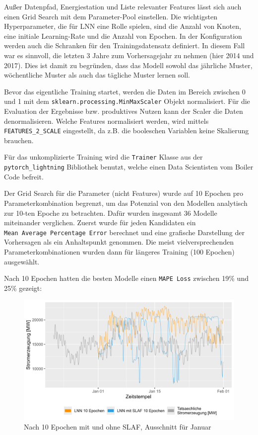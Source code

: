 \documentclass[11pt,ngerman,a4paper,]{article}
\begin{document}
Außer Datenpfad, Energiestation und Liste relevanter Features lässt sich auch einen Grid Search mit dem Parameter-Pool einstellen. Die wichtigsten Hyperparameter, die für LNN eine Rolle spielen, sind die Anzahl von Knoten, eine initiale Learning-Rate und die Anzahl von Epochen.
In der Konfiguration werden auch die Schranken für den Trainingsdatensatz definiert. In diesem Fall war es sinnvoll, die letzten 3 Jahre zum Vorhersagejahr zu nehmen (hier 2014 und 2017). Dies ist damit zu begründen, dass das Modell sowohl das jährliche Muster, wöchentliche Muster als auch das tägliche Muster lernen soll.

Bevor das eigentliche Training startet, werden die Daten im Bereich zwischen 0 und 1 mit dem \texttt{sklearn.processing.MinMaxScaler} Objekt normalisiert. Für die Evaluation der Ergebnisse bzw. produktives Nutzen kann der Scaler die Daten denormalisieren. Welche Features normalisiert werden, wird mittels \texttt{FEATURES\_2\_SCALE} eingestellt, da z.B. die booleschen Variablen keine Skalierung brauchen.

Für das unkomplizierte Training wird die \texttt{Trainer} Klasse aus der \texttt{pytorch\_lightning} Bibliothek benutzt, welche einen Data Scientisten vom Boiler Code befreit.

Der Grid Search für die Parameter (nicht Features) wurde auf 10 Epochen pro Parameterkombination begrenzt, um das Potenzial von den Modellen analytisch zur 10-ten Epoche zu betrachten. Dafür wurden insgesamt 36 Modelle miteinander verglichen. Zuerst wurde für jeden Kandidaten ein \texttt{Mean\ Average\ Percentage\ Error} berechnet und eine grafische Darstellung der Vorhersagen als ein Anhaltspunkt genommen. Die meist vielversprechenden Parameterkombinationen wurden dann für längeres Training (100 Epochen) ausgewählt.

Nach 10 Epochen hatten die besten Modelle einen \texttt{MAPE\ Loss} zwischen 19\% und 25\% gezeigt:

\begin{figure}[H]
\centering
\includegraphics[width=1.0\textwidth]{plots/10_epochs_cobmined_nnLNN mit SLAF 10 Epochen.png}
\caption{Nach 10 Epochen mit und ohne SLAF, Ausschnitt für Januar}
\label{fig:slaf_lnn_10_epochs_january}
\end{figure}
\end{document}
